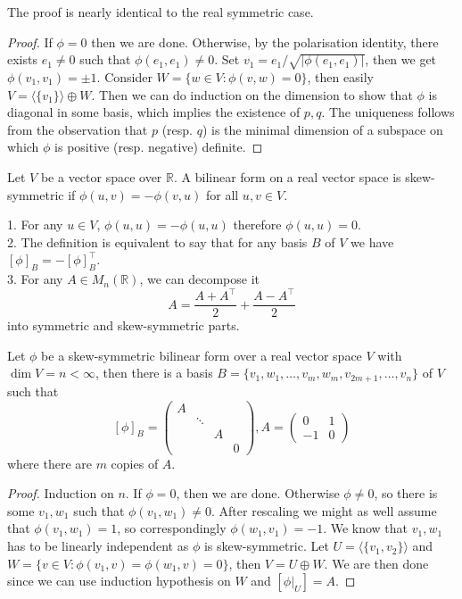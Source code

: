 The proof is nearly identical to the real symmetric case.
\begin{proof}
    If $\phi=0$ then we are done.
    Otherwise, by the polarisation identity, there exists $e_1\neq 0$ such that $\phi(e_1,e_1)\neq 0$.
    Set $v_1=e_1/\sqrt{|\phi(e_1,e_1)|}$, then we get $\phi(v_1,v_1)=\pm 1$.
    Consider $W=\{w\in V:\phi(v,w)=0\}$, then easily $V=\langle\{v_1\}\rangle\oplus W$.
    Then we can do induction on the dimension to show that $\phi$ is diagonal in some basis, which implies the existence of $p,q$.
    The uniqueness follows from the observation that $p$ (resp. $q$) is the minimal dimension of a subspace on which $\phi$ is positive (resp. negative) definite.
\end{proof}
\begin{definition}
    Let $V$ be a vector space over $\mathbb R$.
    A bilinear form on a real vector space is skew-symmetric if $\phi(u,v)=-\phi(v,u)$ for all $u,v\in V$.
\end{definition}
\begin{remark}
    1. For any $u\in V$, $\phi(u,u)=-\phi(u,u)$ therefore $\phi(u,u)=0$.\\
    2. The definition is equivalent to say that for any basis $B$ of $V$ we have $[\phi]_B=-[\phi]_B^\top$.\\
    3. For any $A\in M_n(\mathbb R)$, we can decompose it
    $$A=\frac{A+A^\top}{2}+\frac{A-A^\top}{2}$$
    into symmetric and skew-symmetric parts.
\end{remark}
\begin{theorem}
    Let $\phi$ be a skew-symmetric bilinear form over a real vector space $V$ with $\dim V=n<\infty$, then there is a basis $B=\{v_1,w_1,\ldots,v_m,w_m,v_{2m+1},\ldots,v_n\}$ of $V$ such that
    $$[\phi]_B=\begin{pmatrix}
        A&&&\\
        &\ddots&&\\
        &&A&\\
        &&&0
    \end{pmatrix},A=\begin{pmatrix}
        0&1\\
        -1&0 
    \end{pmatrix}$$
    where there are $m$ copies of $A$.
\end{theorem}
\begin{proof}
    Induction on $n$.
    If $\phi=0$, then we are done.
    Otherwise $\phi\neq 0$, so there is some $v_1,w_1$ such that $\phi(v_1,w_1)\neq 0$.
    After rescaling we might as well assume that $\phi(v_1,w_1)=1$, so correspondingly $\phi(w_1,v_1)=-1$.
    We know that $v_1,w_1$ has to be linearly independent as $\phi$ is skew-symmetric.
    Let $U=\langle\{v_1,v_2\}\rangle$ and $W=\{v\in V:\phi(v_1,v)=\phi(w_1,v)=0\}$, then $V=U\oplus W$.
    We are then done since we can use induction hypothesis on $W$ and $[\phi|_U]=A$.
\end{proof}
